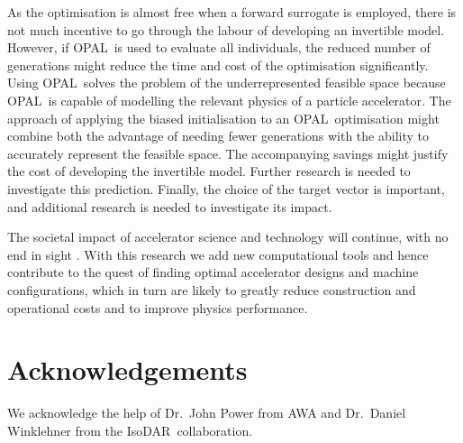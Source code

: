 \documentclass[a4paper, 12pt, version-1-compatibility]{article}
\def\forwardmodel{forward model}
\def\invertiblemodel{invertible model}
\def\isodar{IsoDAR}
\def\opal{OPAL}
\begin{document}
As the optimisation is almost free when a forward surrogate is employed, there is not much incentive to go through the labour of developing an \invertiblemodel. However, if \opal\ is used to evaluate all individuals, the reduced number of generations might reduce the time and cost of the optimisation significantly. Using \opal\ solves the problem of the underrepresented feasible space because \opal\ is capable of modelling the relevant physics of a particle accelerator. The approach of applying the biased initialisation to an \opal\ optimisation might combine both the advantage of needing fewer generations with the ability to accurately represent the feasible space. The accompanying savings might justify the cost of developing the \invertiblemodel. Further research is needed to investigate this prediction. Finally, the choice of the target vector is important, and additional research is needed to investigate its impact.

The societal impact of accelerator science and technology will continue, with no end in sight \cite{no-front,accel-phys-tod-2020,abs:isodar,alonso:isotopes}. With this research we add new computational tools and hence contribute to the quest of finding optimal accelerator designs and machine configurations, which in turn are likely to greatly reduce construction and operational costs and to improve physics performance. 



\printbibliography

\section*{Acknowledgements}
We acknowledge the help of Dr.\ John Power from AWA and
Dr.\ Daniel Winklehner from the \isodar\ collaboration.
\end{document}
